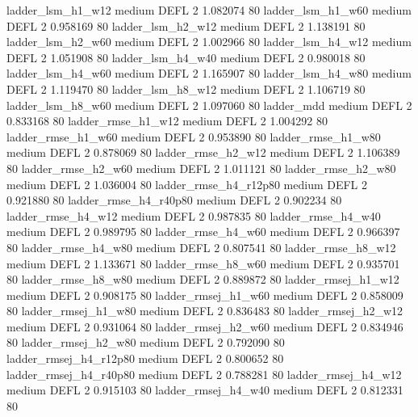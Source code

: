      ladder_lsm_h1_w12     medium     DEFL                 2 1.082074 80
     ladder_lsm_h1_w60     medium     DEFL                 2 0.958169 80
     ladder_lsm_h2_w12     medium     DEFL                 2 1.138191 80
     ladder_lsm_h2_w60     medium     DEFL                 2 1.002966 80
     ladder_lsm_h4_w12     medium     DEFL                 2 1.051908 80
     ladder_lsm_h4_w40     medium     DEFL                 2 0.980018 80
     ladder_lsm_h4_w60     medium     DEFL                 2 1.165907 80
     ladder_lsm_h4_w80     medium     DEFL                 2 1.119470 80
     ladder_lsm_h8_w12     medium     DEFL                 2 1.106719 80
     ladder_lsm_h8_w60     medium     DEFL                 2 1.097060 80
            ladder_mdd     medium     DEFL                 2 0.833168 80
    ladder_rmse_h1_w12     medium     DEFL                 2 1.004292 80
    ladder_rmse_h1_w60     medium     DEFL                 2 0.953890 80
    ladder_rmse_h1_w80     medium     DEFL                 2 0.878069 80
    ladder_rmse_h2_w12     medium     DEFL                 2 1.106389 80
    ladder_rmse_h2_w60     medium     DEFL                 2 1.011121 80
    ladder_rmse_h2_w80     medium     DEFL                 2 1.036004 80
 ladder_rmse_h4_r12p80     medium     DEFL                 2 0.921880 80
 ladder_rmse_h4_r40p80     medium     DEFL                 2 0.902234 80
    ladder_rmse_h4_w12     medium     DEFL                 2 0.987835 80
    ladder_rmse_h4_w40     medium     DEFL                 2 0.989795 80
    ladder_rmse_h4_w60     medium     DEFL                 2 0.966397 80
    ladder_rmse_h4_w80     medium     DEFL                 2 0.807541 80
    ladder_rmse_h8_w12     medium     DEFL                 2 1.133671 80
    ladder_rmse_h8_w60     medium     DEFL                 2 0.935701 80
    ladder_rmse_h8_w80     medium     DEFL                 2 0.889872 80
   ladder_rmsej_h1_w12     medium     DEFL                 2 0.908175 80
   ladder_rmsej_h1_w60     medium     DEFL                 2 0.858009 80
   ladder_rmsej_h1_w80     medium     DEFL                 2 0.836483 80
   ladder_rmsej_h2_w12     medium     DEFL                 2 0.931064 80
   ladder_rmsej_h2_w60     medium     DEFL                 2 0.834946 80
   ladder_rmsej_h2_w80     medium     DEFL                 2 0.792090 80
ladder_rmsej_h4_r12p80     medium     DEFL                 2 0.800652 80
ladder_rmsej_h4_r40p80     medium     DEFL                 2 0.788281 80
   ladder_rmsej_h4_w12     medium     DEFL                 2 0.915103 80
   ladder_rmsej_h4_w40     medium     DEFL                 2 0.812331 80

